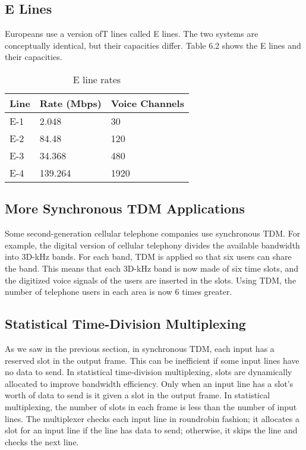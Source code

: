 \subsection*{E Lines}
Europeans use a version ofT lines called E lines. The two systems are conceptually identical, but their capacities differ. Table 6.2 shows the E lines and their capacities.

\begin{table}[htbp]
  \centering
  \caption{E line rates}
  \begin{tabular}{p{} p{} p{}} 
   \toprule
   Line & Rate (Mbps) & Voice Channels \\
   \midrule
   E-1 & 2.048 & 30 \\ 
   E-2 & 84.48 & 120 \\
   E-3 & 34.368 & 480 \\
   E-4 & 139.264 & 1920 \\
   \bottomrule
  \end{tabular}
  \label{tab6:2}
\end{table}

\subsection*{More Synchronous TDM Applications}
Some second-generation cellular telephone companies use synchronous TDM. For example, the digital version of cellular telephony divides the available bandwidth into 3D-kHz bands. For each band, TDM is applied so that six users can share the band. This means that each 3D-kHz band is now made of six time slots, and the digitized voice signals of the users are inserted in the slots. Using TDM, the number of telephone users in each area is now 6 times greater.

\subsection{Statistical Time-Division Multiplexing}
As we saw in the previous section, in synchronous TDM, each input has a reserved slot in the output frame. This can be inefficient if some input lines have no data to send. In statistical time-division multiplexing, slots are dynamically allocated to improve bandwidth efficiency. Only when an input line has a slot's worth of data to send is it given a slot in the output frame. In statistical multiplexing, the number of slots in each frame is less than the number of input lines. The multiplexer checks each input line in roundrobin fashion; it allocates a slot for an input line if the line has data to send; otherwise, it skips the line and checks the next line.


